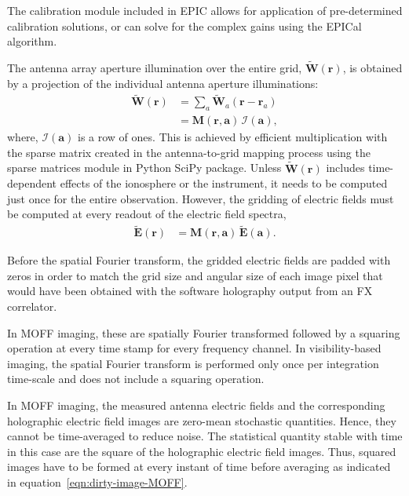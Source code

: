 \documentclass[a4paper,fleqn,usenatbib]{mnras}
\begin{document}
The calibration module included in EPIC allows for application of pre-determined 
calibration solutions, or can solve for the complex gains using the EPICal 
algorithm.

\par\medskip
{}
\par\medskip
\noindent The antenna array aperture illumination over the entire grid,
$\widetilde{\mathbf{W}}(\mathbf{r})$, is obtained by a projection of the 
individual antenna aperture illuminations:
\begin{align}\label{eqn:gridding-convolution}
  \widetilde{\mathbf{W}}(\mathbf{r}) &= \sum_a \widetilde{\mathbf{W}}_a(\mathbf{r}-\mathbf{r}_a) \\
                            &= \mathbf{M}(\mathbf{r},\mathbf{a})\,\mathcal{I}(\mathbf{a}),
\end{align}
where, $\mathcal{I}(\mathbf{a})$ is a row of ones. This is achieved by
efficient multiplication with the sparse matrix created in the antenna-to-grid
mapping process using the sparse matrices module in Python SciPy package. 
Unless $\widetilde{\mathbf{W}}(\mathbf{r})$ includes time-dependent
effects of the ionosphere or the instrument, it needs to be computed just once
for the entire observation. However, the gridding of electric fields must be
computed at every readout of the electric field spectra,
\begin{align}
  \widetilde{\mathbf{E}}(\mathbf{r}) &= \mathbf{M}(\mathbf{r},\mathbf{a})\,\widetilde{\mathbf{E}}(\mathbf{a}).
\end{align}

\par\medskip
{}
\par\medskip
\noindent Before the spatial Fourier transform, the gridded electric fields are 
padded with zeros in order to match the grid size and angular size of each image 
pixel that would have been obtained with the software holography output from an 
FX correlator. 

In MOFF imaging, these are spatially Fourier transformed followed by a squaring
operation at every time stamp for every frequency channel. In visibility-based 
imaging, the spatial Fourier transform is performed only once per integration 
time-scale and does not include a squaring operation.

\par\medskip
{}
\par\medskip
\noindent In MOFF imaging, the measured antenna electric fields and the 
corresponding holographic electric field images are zero-mean stochastic 
quantities. Hence, they cannot be time-averaged to reduce noise. The statistical 
quantity stable with time in this case are the square of the holographic 
electric field images. Thus, squared images have to be formed at every instant 
of time before averaging as indicated in equation~\ref{eqn:dirty-image-MOFF}.
\end{document}
